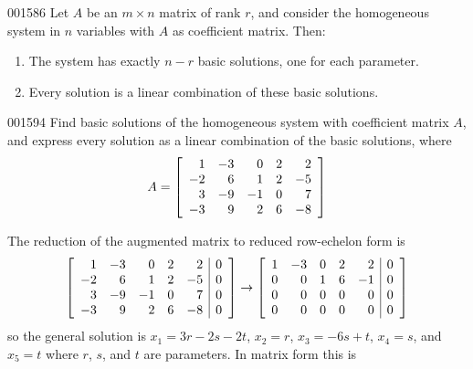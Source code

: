 \begin{theorem}{}{001586}
Let $A$ be an $m \times n$ matrix of rank $r$, and consider the homogeneous system in $n$ variables with $A$ as coefficient matrix. Then:

\begin{enumerate}
\item The system has exactly $n-r$ basic solutions, one for each parameter.

\item Every solution is a linear combination of these basic solutions.

\end{enumerate}
\end{theorem}

\begin{example}{}{001594}
Find basic solutions of the homogeneous system with coefficient matrix $A$, and express every solution as a linear combination of the basic solutions, where
\begin{equation*}
A = \left[ \begin{array}{rrrrr}
	 1 & -3 &  0 & 2 &  2 \\
	-2 &  6 &  1 & 2 & -5 \\
	 3 & -9 & -1 & 0 & 7 \\
	-3 &  9 &  2 & 6 & -8 
\end{array} \right]
\end{equation*}
\begin{solution}
  The reduction of the augmented matrix to reduced row-echelon form is
\begin{equation*}
\left[ \begin{array}{rrrrr|r}
	 1 & -3 &  0 & 2 &  2 & 0 \\
	-2 &  6 &  1 & 2 & -5 & 0 \\
	 3 & -9 & -1 & 0 &  7 & 0 \\
	-3 &  9 &  2 & 6 & -8 & 0
\end{array} \right]
\rightarrow
\left[ \begin{array}{rrrrr|r}
	1 & -3 &  0 & 2 &  2 & 0 \\
	0 &  0 &  1 & 6 & -1 & 0 \\
	0 &  0 &  0 & 0 &  0 & 0 \\
	0 &  0 &  0 & 0 &  0 & 0 \\
\end{array} \right]
\end{equation*}
so the general solution is $x_1 = 3r - 2s - 2t$, $x_2 = r$, $x_3 = -6s + t$, $x_4 = s$, and $x_5 = t$ where $r$, $s$, and $t$ are parameters. In matrix form this is

\end{solution}
\end{example}
